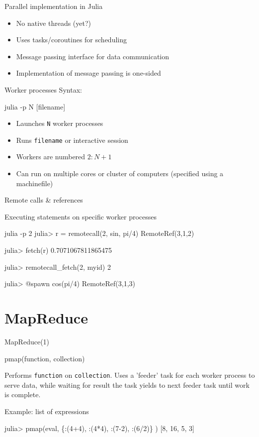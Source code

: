 \documentclass{beamer}
\begin{document}
	\begin{frame}{Parallel implementation in Julia}
		\begin{itemize}
			\item{No native threads (yet?)}
			\item{Uses tasks/coroutines for scheduling}
			\item{Message passing interface for data communication}
			\item{Implementation of message passing is one-sided}
		\end{itemize}
	\end{frame}
	
	\begin{frame}[fragile]{Worker processes}
		Syntax:
		\begin{semiverbatim}
			julia -p N [filename]
		\end{semiverbatim}
		\begin{itemize}
			\item{Launches \verb+N+ worker processes}
			\item{Runs \verb+filename+ or interactive session}
			\item{Workers are numbered $2:N+1$}
			\item{Can run on multiple cores or cluster of computers (specified using a machinefile)}
		\end{itemize}
	\end{frame}

	\begin{frame}[fragile]{Remote calls \& references}
		\begin{block}{Executing statements on specific worker processes}
		\begin{semiverbatim}
		julia -p 2
		julia> r = remotecall(2, sin, pi/4)
		RemoteRef(3,1,2) 

		julia> fetch(r)
		0.7071067811865475

		julia> remotecall\_fetch(2, myid)
		2
		
		julia> @spawn cos(pi/4) 
		RemoteRef(3,1,3)
		\end{semiverbatim}
		\end{block}
	\end{frame}

	\section{MapReduce}
	\begin{frame}[fragile]{MapReduce(1)}
		\begin{semiverbatim}
			pmap(function, collection)
		\end{semiverbatim}
		Performs \verb+function+ on \verb+collection+. Uses a 'feeder' task for each worker process to serve data, while waiting for result the task yields to next feeder task until work is complete. 
		\begin{block}{Example: list of expressions}
			\begin{semiverbatim}
				julia> pmap(eval, \{:(4+4), :(4*4), :(7-2), :(6/2)\} )
				[8, 16, 5, 3]
			\end{semiverbatim}
		\end{block}
	\end{frame}
\end{document}
